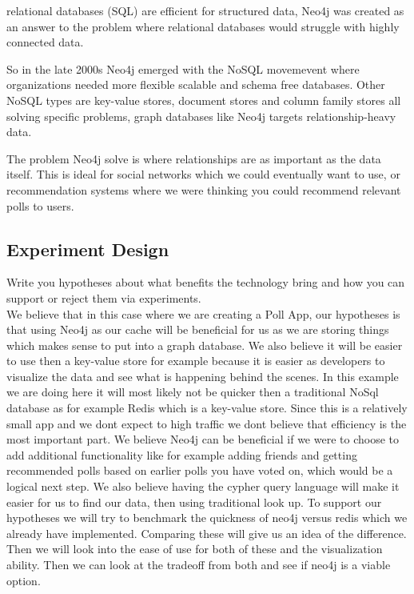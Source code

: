relational databases (SQL) are efficient for structured data, Neo4j was created as an answer to the problem where relational databases would struggle with highly connected data. 

So in the late 2000s Neo4j emerged with the NoSQL movemevent where organizations needed more flexible scalable and schema free databases. Other NoSQL types are key-value stores, document stores and column family stores all solving specific problems, graph databases like Neo4j targets relationship-heavy data.

The problem Neo4j solve is where relationships are as important as the data itself. This is ideal for social networks which we could eventually want to use, or recommendation systems where we were thinking you could recommend relevant polls to users.

\subsection{Experiment Design}

Write you hypotheses about what benefits the technology bring and how you can support or reject them via experiments.
\\

We believe that in this case where we are creating a Poll App, our hypotheses is that using Neo4j as our cache will be beneficial for us as we are storing things which makes sense to put into a graph database. We also believe it will be easier to use then a key-value store for example because it is easier as developers to visualize the data and see what is happening behind the scenes. In this example we are doing here it will most likely not be quicker then a traditional NoSql database as for example Redis which is a key-value store. Since this is a relatively small app and we dont expect to high traffic we dont believe that efficiency is the most important part. We believe Neo4j can be beneficial if we were to choose to add additional functionality like for example adding friends and getting recommended polls based on earlier polls you have voted on, which would be a logical next step. We also believe having the cypher query language will make it easier for us to find our data, then using traditional look up. To support our hypotheses we will try to benchmark the quickness of neo4j versus redis which we already have implemented. Comparing these will give us an idea of the difference. Then we will look into the ease of use for both of these and the visualization ability. Then we can look at the tradeoff from both and see if neo4j is a viable option.

